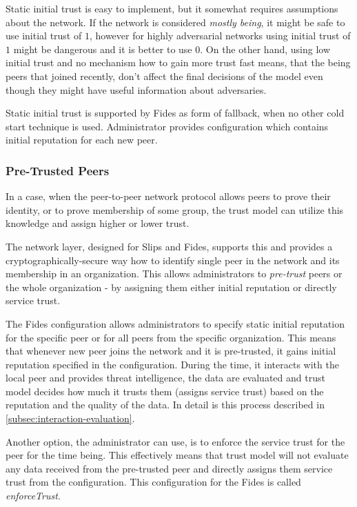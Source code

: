Static initial trust is easy to implement, but it somewhat requires assumptions about the network. If the network is considered \textit{mostly being}, it might be safe to use initial trust of $1$, however for highly adversarial networks using initial trust of $1$ might be dangerous and it is better to use $0$. 
On the other hand, using low initial trust and no mechanism how to gain more trust fast means, that the being peers that joined recently, don't affect the final decisions of the model even though they might have useful information about adversaries.

Static initial trust is supported by Fides as form of fallback, when no other cold start technique is used. Administrator provides configuration which contains initial reputation for each new peer.

\subsubsection{Pre-Trusted Peers}
\label{subsubsec:pre-trusted-peers}
In a case, when the peer-to-peer network protocol allows peers to prove their identity, or to prove membership of some group, the trust model can utilize this knowledge and assign higher or lower trust.

The network layer, designed for Slips and Fides, supports this\cite{nl} and provides a cryptographically-secure way how to identify single peer in the network and its membership in an organization.
This allows administrators to \textit{pre-trust} peers or the whole organization - by assigning them either initial reputation or directly service trust.

The Fides configuration allows administrators to specify static initial reputation for the specific peer or for all peers from the specific organization. 
This means that whenever new peer joins the network and it is pre-trusted, it gains initial reputation specified in the configuration.
During the time, it interacts with the local peer and provides threat intelligence, the data are evaluated and trust model decides how much it trusts them (assigns service trust) based on the reputation and the quality of the data. In detail is this process described in \ref{subsec:interaction-evaluation}.

Another option, the administrator can use, is to enforce the service trust for the peer for the time being. This effectively means that trust model will not evaluate any data received from the pre-trusted peer and directly assigns them service trust from the configuration. This configuration for the Fides is called \textit{enforceTrust}.

